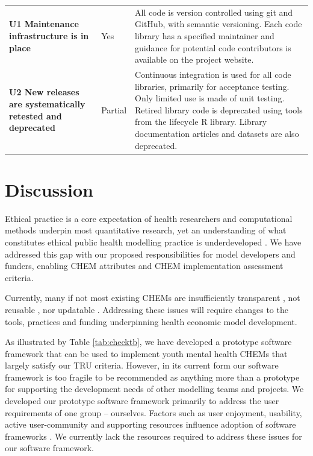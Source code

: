 \documentclass[sn-vancouver,Numbered,pdflatex]{sn-jnl}
\theoremstyle{remark}
\theoremstyle{definition}
\begin{document}
\begin{landscape}
\begin{table}
\begin{tabular}[t]{>{\raggedright\arraybackslash}p{10em}l>{\raggedright\arraybackslash}p{35em}}
\textbf{U1 Maintenance infrastructure is in place} & Yes & All code is version controlled using git and GitHub, with semantic versioning. Each code library has a specified maintainer and guidance for potential code contributors is available on the project website.\\
\addlinespace
\textbf{U2 New releases are systematically retested and deprecated} & Partial & Continuous integration is used for all code libraries, primarily for acceptance testing. Only limited use is made of unit testing. Retired library code is deprecated using tools from the lifecycle R library. Library documentation articles and datasets are also deprecated.\\
\bottomrule
\end{tabular}
\end{table}

\end{landscape}

\hypertarget{discussion}{%
\section{Discussion}\label{discussion}}

Ethical practice is a core expectation of health researchers and computational methods underpin most quantitative research, yet an understanding of what constitutes ethical public health modelling practice is underdeveloped \citep{10.3389/fpubh.2017.00068}. We have addressed this gap with our proposed responsibilities for model developers and funders, enabling CHEM attributes and CHEM implementation assessment criteria.

Currently, many if not most existing CHEMs are insufficiently transparent \citep{Jalali2021, McManus2019, Bermejo2017, Ghabri2019}, not reusable \citep{Feenstra2022, Emerson2019}, nor updatable \citep{Sampson2017, 10.3389/fpubh.2022.899874}. Addressing these issues will require changes to the tools, practices and funding underpinning health economic model development.

As illustrated by Table \ref{tab:checktb}, we have developed a prototype software framework that can be used to implement youth mental health CHEMs that largely satisfy our TRU criteria. However, in its current form our software framework is too fragile to be recommended as anything more than a prototype for supporting the development needs of other modelling teams and projects. We developed our prototype software framework primarily to address the user requirements of one group -- ourselves. Factors such as user enjoyment, usability, active user-community and supporting resources influence adoption of software frameworks \citep{myllarniemi2018development}. We currently lack the resources required to address these issues for our software framework.
\end{document}
